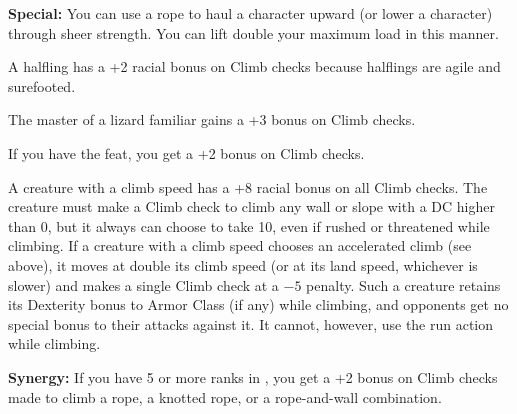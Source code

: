 \textbf{Special:} You can use a rope to haul a character upward (or lower a character) through sheer strength. You can lift double your maximum load in this manner.

A halfling has a +2 racial bonus on Climb checks because halflings are agile and surefooted.

The master of a lizard familiar gains a +3 bonus on Climb checks.

If you have the  feat, you get a +2 bonus on Climb checks.

A creature with a climb speed has a +8 racial bonus on all Climb checks. The creature must make a Climb check to climb any wall or slope with a DC higher than 0, but it always can choose to take 10, even if rushed or threatened while climbing. If a creature with a climb speed chooses an accelerated climb (see above), it moves at double its climb speed (or at its land speed, whichever is slower) and makes a single Climb check at a $-5$ penalty. Such a creature retains its Dexterity bonus to Armor Class (if any) while climbing, and opponents get no special bonus to their attacks against it. It cannot, however, use the run action while climbing.

\textbf{Synergy:} If you have 5 or more ranks in , you get a +2 bonus on Climb checks made to climb a rope, a knotted rope, or a rope-and-wall combination.